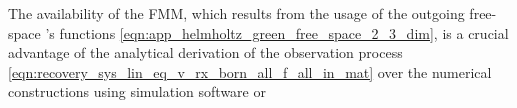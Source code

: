 The availability of
the \ac{FMM}, which results from
the usage of
the outgoing free-space 's functions
\eqref{eqn:app_helmholtz_green_free_space_2_3_dim}, is
a crucial advantage of
the analytical derivation of
the observation process
\eqref{eqn:recovery_sys_lin_eq_v_rx_born_all_f_all_in_mat} over
the numerical constructions using
simulation software or
